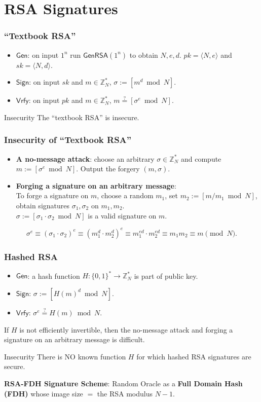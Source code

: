 \section{RSA Signatures}
\begin{frame}\frametitle{``Textbook RSA''}
\begin{construction}
\begin{itemize}
\item $\mathsf{Gen}$: on input $1^n$ run $\mathsf{GenRSA}(1^n)$ to obtain $N,e,d$. $pk = \langle N,e \rangle$ and $sk = \langle N,d \rangle$.
\item $\mathsf{Sign}$: on input $sk$ and $m \in \mathbb{Z}^*_N$, $\sigma:= [m^d \bmod N]$.
\item $\mathsf{Vrfy}$: on input $pk$ and $m \in \mathbb{Z}^*_N$, $m \overset{?}{=} [\sigma^e \bmod N]$.
\end{itemize}
\end{construction}
\begin{alertblock}{Insecurity}
The ``textbook RSA'' is insecure. 
\end{alertblock}
\end{frame}
\begin{frame}\frametitle{Insecurity of ``Textbook RSA''}
\begin{itemize}
\item \textbf{A no-message attack}:
choose an arbitrary $\sigma \in \mathbb{Z}^*_N$ and compute $m := [\sigma^e \bmod N]$. Output the forgery $(m,\sigma)$.
\item \textbf{Forging a signature on an arbitrary message}:\\
To forge a signature on $m$, choose a random $m_1$, set $m_2 := [m/m_1 \bmod N]$,  obtain signatures $\sigma_1, \sigma_2$ on $m_1, m_2$. \\
$\sigma := [\sigma_1\cdot \sigma_2 \bmod N]$ is a valid signature on $m$.
\end{itemize}
\[\sigma^e \equiv (\sigma_1\cdot \sigma_2)^e \equiv (m^d_1\cdot m^d_2)^e \equiv m_1^{ed}\cdot m_2^{ed} \equiv m_1m_2 \equiv m \pmod N.\]
\end{frame}
\begin{frame}\frametitle{Hashed RSA}
\begin{itemize}
\item $\mathsf{Gen}$: a hash function $H : \{0,1\}^* \to \mathbb{Z}_N^*$ is part of public key.
\item $\mathsf{Sign}$: $\sigma := [H(m)^d \bmod N]$.
\item $\mathsf{Vrfy}$: $\sigma^e \overset{?}{=} H(m) \bmod N$.
\end{itemize}
If $H$ is not efficiently invertible, then the no-message attack and forging a signature on an arbitrary message is difficult.
\begin{alertblock}{Insecurity}
There is NO known function $H$ for which hashed RSA signatures are secure.
\end{alertblock}
\textbf{RSA-FDH Signature Scheme}: Random Oracle as a \textbf{Full Domain Hash (FDH)} whose image size $=$ the RSA modulus $N-1$.
\end{frame}
